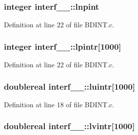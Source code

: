 \subsubsection[{\texorpdfstring{lnpint}{lnpint}}]{\setlength{\rightskip}{0pt plus 5cm}integer interf\+\_\+\_\+\+::lnpint}\hypertarget{structinterf__1___acb41dcd3607da9a107db4e6ba628c049}{}\label{structinterf__1___acb41dcd3607da9a107db4e6ba628c049}


Definition at line 22 of file B\+D\+I\+N\+T.\+c.

\subsubsection[{\texorpdfstring{lpintr}{lpintr}}]{\setlength{\rightskip}{0pt plus 5cm}integer interf\+\_\+\_\+\+::lpintr\mbox{[}1000\mbox{]}}\hypertarget{structinterf__1___ad5bbd72f558be286c578c06e304bc9b5}{}\label{structinterf__1___ad5bbd72f558be286c578c06e304bc9b5}


Definition at line 22 of file B\+D\+I\+N\+T.\+c.

\subsubsection[{\texorpdfstring{luintr}{luintr}}]{\setlength{\rightskip}{0pt plus 5cm}doublereal interf\+\_\+\_\+\+::luintr\mbox{[}1000\mbox{]}}\hypertarget{structinterf__1___aa5a09cbc8009ff8ca789af3921b2d8d8}{}\label{structinterf__1___aa5a09cbc8009ff8ca789af3921b2d8d8}


Definition at line 18 of file B\+D\+I\+N\+T.\+c.

\subsubsection[{\texorpdfstring{lvintr}{lvintr}}]{\setlength{\rightskip}{0pt plus 5cm}doublereal interf\+\_\+\_\+\+::lvintr\mbox{[}1000\mbox{]}}\hypertarget{structinterf__1___aa9491f2ae4fa6812be83c1ad81af9de4}{}\label{structinterf__1___aa9491f2ae4fa6812be83c1ad81af9de4}


